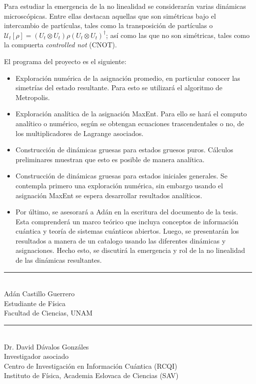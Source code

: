 \documentclass[10pt]{article}
\newcommand{\mcU}{\mathcal{U}}
\begin{document}
Para estudiar la emergencia de la no linealidad se considerarán varias dinámicas microscópicas. Entre ellas destacan aquellas que son simétricas bajo el intercambio de partículas, tales como la transposición de partículas o $\mcU_t[\rho]=(U_t \otimes U_t) \rho (U_t \otimes U_t)^\dagger{}$; así como las que no son simétricas, tales como la compuerta \textit{controlled not} (CNOT).

El programa del proyecto es el siguiente:
\begin{itemize}
\item Exploración numérica de la asignación promedio, en particular conocer las simetrías del estado resultante. Para esto se utilizará  el algoritmo de Metropolis.
\item Exploración analítica de la asignación MaxEnt. Para ello se hará el computo analítico o numérico, según se obtengan ecuaciones trascendentales o no, de los multiplicadores de Lagrange asociados.
\item Construcción de dinámicas gruesas para estados gruesos puros. Cálculos preliminares muestran que esto es posible de manera analítica.
\item Construcción de dinámicas gruesas para estados iniciales generales. Se contempla primero una exploración numérica, sin embargo usando el asignación MaxEnt se espera desarrollar resultados analíticos.
\item Por último, se asesorará a Adán en la escritura del documento de la tesis. Esta comprenderá un marco teórico que incluya conceptos de información cuántica y teoría de sistemas cuánticos abiertos. Luego, se presentarán los resultados a manera de un catalogo usando las diferentes dinámicas y asignaciones. Hecho esto, se discutirá la emergencia y rol de la no linealidad de las dinámicas resultantes.
\end{itemize}

\vspace{1.5cm}


\begin{center}
    \rule{200pt}{0.4pt}\\
    Adán Castillo Guerrero \\
    Estudiante de Física \\
    Facultad de Ciencias, UNAM \\
    
\end{center}

\vspace{1.0cm}

\begin{center}
    \rule{200pt}{0.4pt}\\
    Dr. David Dávalos Gonzáles \\
    Investigador asociado\\
    Centro de Investigación en Información Cuántica (RCQI)\\
    Instituto de Física, Academia Eslovaca de Ciencias (SAV)
\end{center}


\end{document}
